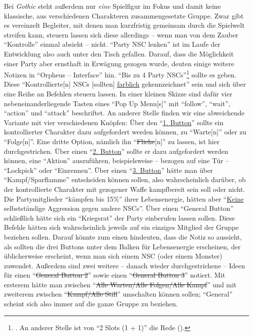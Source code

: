 \documentclass[a5paper,pagesize,numbers=noenddot]{scrbook}
\begin{document}
Bei \textit{Gothic} steht außerdem nur \textit{eine} Spielfigur im Fokus und damit keine klassische, aus verschiedenen Charakteren zusammengesetzte Gruppe.
Zwar gibt es vereinzelt Begleiter, mit denen man kurzfristig gemeinsam durch die Spielwelt streifen kann, steuern lassen sich diese allerdings -- wenn man von dem Zauber \enquote{Kontrolle} einmal absieht -- nicht. %
\enquote{Party NSC lenken} ist im Laufe der Entwicklung also auch unter den Tisch gefallen.
Darauf, dass die Möglichkeit einer Party aber ernsthaft in Erwägung gezogen wurde, deuten einige weitere Notizen in \enquote{Orpheus -- Interface} hin.
\enquote{Bis zu 4 Party NSCs}\footnote{\autocite[S.~5]{orpheus_interface}. An anderer Stelle ist von \enquote{2 Slots (1 + 1)} die Rede (\autocite[S.~7]{orpheus_b_scribbles}).} sollte es geben.
Diese \enquote{Kontrollierte[n] NSCs [sollten] \uline{farblich} gekennzeichnet}\autocite[S.~5]{orpheus_interface} sein und sich über eine Reihe an Befehlen steuern lassen.
In einer kleinen Skizze sind dafür vier nebeneinanderliegende Tasten eines \enquote{Pop Up Menu[s]} mit \enquote{follow}, \enquote{wait}, \enquote{action} und \enquote{attack} beschriftet.\autocite[S.~3]{orpheus_interface}
An anderer Stelle finden wir eine abweichende Variante mit vier verschiedenen Knöpfen:
Über den \enquote{\uline{1. Button}} sollte ein kontrollierter Charakter dazu aufgefordert werden können, zu \enquote{Warte[n]} oder zu \enquote{Folge[n]}.
Eine dritte Option, nämlich ihn \enquote{\sout{Fliehe}[n]} zu lassen, ist hier durchgestrichen.
Über einen \enquote{\uline{2. Button}} sollte er dazu aufgefordert werden können, eine \enquote{Aktion} auszuführen, beispielsweise -- bezogen auf eine Tür -- \enquote{Lockpick} oder \enquote{Einrennen}.
Über einen \enquote{\uline{3. Button}} hätte man über \enquote{Kampf/Sparflamme} entscheiden können sollen, also wahrscheinlich darüber, ob der kontrollierte Charakter mit gezogener Waffe kampfbereit sein soll oder nicht.
Die Partymitglieder \enquote{kämpfen bis 15\%} ihrer Lebensenergie, hätten aber \enquote{\uline{Keine} selbstständige Aggression gegen andere NSCs}.
Über einen \enquote{General Button} schließlich hätte sich ein \enquote{Kriegsrat} der Party einberufen lassen sollen.
Diese Befehle hätten sich wahrscheinlich jeweils auf ein einziges Mitglied der Gruppe beziehen sollen.
Darauf könnte zum einen hindeuten, dass die Notiz so aussieht, als sollten die drei Buttons unter dem Balken für Lebensenergie erscheinen, der üblicherweise erscheint, wenn man sich einem NSC (oder einem Monster) zuwendet.
Außerdem sind zwei weitere -- danach wieder durchgestrichene -- Ideen für einen \enquote{\sout{General Button 2}} sowie einen \enquote{\sout{General Button 3}} notiert.
Mit ersterem hätte man zwischen \enquote{\sout{Alle Warten/Alle Folgen/Alle Kampf}} und mit zweiterem zwischen \enquote{\sout{Kampf/Alle Still}} umschalten können sollen;\autocite[S.~5]{orpheus_interface} \enquote{General} scheint sich also immer auf die ganze Gruppe zu beziehen.
\end{document}
